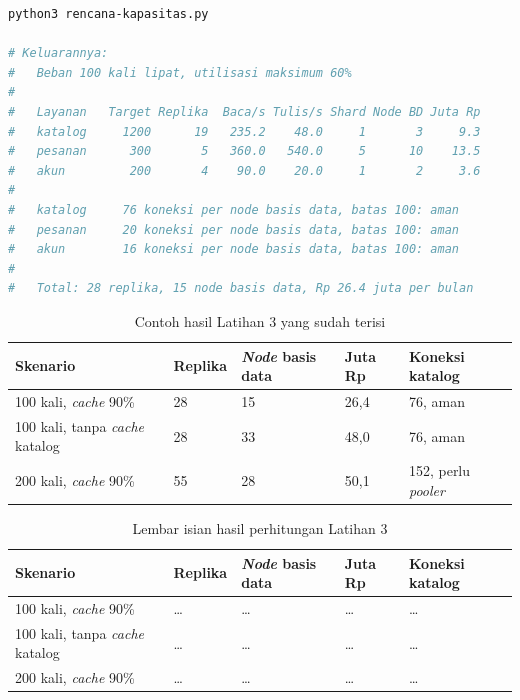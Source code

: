 \begin{lstlisting}[language=bash, caption={Menyusun rencana kapasitas, tersedia di \berkas{sources/chapter14/rencana-kapasitas.py}}, label={lst:c14-lat3-jalan}]
python3 rencana-kapasitas.py

# Keluarannya:
#   Beban 100 kali lipat, utilisasi maksimum 60%
#
#   Layanan   Target Replika  Baca/s Tulis/s Shard Node BD Juta Rp
#   katalog     1200      19   235.2    48.0     1       3     9.3
#   pesanan      300       5   360.0   540.0     5      10    13.5
#   akun         200       4    90.0    20.0     1       2     3.6
#
#   katalog     76 koneksi per node basis data, batas 100: aman
#   pesanan     20 koneksi per node basis data, batas 100: aman
#   akun        16 koneksi per node basis data, batas 100: aman
#
#   Total: 28 replika, 15 node basis data, Rp 26.4 juta per bulan
\end{lstlisting}

\begin{table}[!htb]
  \centering
  \caption{Contoh hasil Latihan 3 yang sudah terisi}
  \label{tab:c14-lat3-contoh}
  \begin{tabularx}{\textwidth}{Xllll}
    \hline
    \textbf{Skenario} & \textbf{Replika} & \textbf{\textit{Node} basis data} & \textbf{Juta Rp} & \textbf{Koneksi katalog} \\
    \hline
    100 kali, \textit{cache} 90\% & 28 & 15 & 26,4 & 76, aman \\
    \hline
    100 kali, tanpa \textit{cache} katalog & 28 & 33 & 48,0 & 76, aman \\
    \hline
    200 kali, \textit{cache} 90\% & 55 & 28 & 50,1 & 152, perlu \textit{pooler} \\
    \hline
  \end{tabularx}
\end{table}

\begin{table}[!htb]
  \centering
  \caption{Lembar isian hasil perhitungan Latihan 3}
  \label{tab:c14-lat3-hasil}
  \begin{tabularx}{\textwidth}{Xllll}
    \hline
    \textbf{Skenario} & \textbf{Replika} & \textbf{\textit{Node} basis data} & \textbf{Juta Rp} & \textbf{Koneksi katalog} \\
    \hline
    100 kali, \textit{cache} 90\% & \dots & \dots & \dots & \dots \\
    \hline
    100 kali, tanpa \textit{cache} katalog & \dots & \dots & \dots & \dots \\
    \hline
    200 kali, \textit{cache} 90\% & \dots & \dots & \dots & \dots \\
    \hline
  \end{tabularx}
\end{table}

